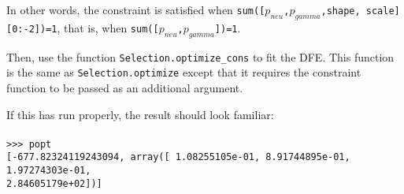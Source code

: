 \documentclass[11pt]{article}
\begin{document}


In other words, the constraint is satisfied when \texttt{sum([$p_{neu}$,$p_{gamma}$,shape, scale][0:-2])=1}, that is, when \texttt{sum([$p_{neu}$,$p_{gamma}$])=1}.

Then, use the function \texttt{Selection.optimize\_cons} to fit the DFE. This function is the same as \texttt{Selection.optimize} except that it requires the constraint function to be passed as an additional argument.



If this has run properly, the result should look familiar: \\ \\
\texttt{>>> popt} \\
\texttt{[-677.82324119243094, array([  1.08255105e-01,   8.91744895e-01,   1.97274303e-01, } \\
\texttt{2.84605179e+02])]}

{}

\end{document}
